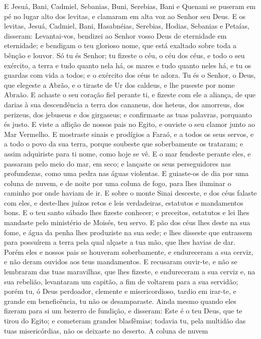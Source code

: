 E Jesuá, Bani, Cadmiel, Sebanias, Buni, Serebias, Bani e Quenani
se puseram em pé no lugar alto dos levitas, e clamaram em alta voz
ao Senhor seu Deus. E os levitas, Jesuá, Cadmiel, Bani,
Hasabnéias, Serebias, Hodias, Sebanias e Petaías, disseram:
Levantai-vos, bendizei ao Senhor vosso Deus de eternidade em
eternidade; e bendigam o teu glorioso nome, que está exaltado sobre
toda a bênção e louvor. Só tu és Senhor; tu fizeste o céu, o céu
dos céus, e todo o seu exército, a terra e tudo quanto nela há, os
mares e tudo quanto neles há, e tu os guardas com vida a todos; e o
exército dos céus te adora. Tu és o Senhor, o Deus, que elegeste
a Abrão, e o tiraste de Ur dos caldeus, e lhe puseste por nome
Abraão. E achaste o seu coração fiel perante ti, e fizeste com
ele a aliança, de que darias à sua descendência a terra dos
cananeus, dos heteus, dos amorreus, dos perizeus, dos jebuseus e dos
girgaseus; e confirmaste as tuas palavras, porquanto és justo. E
viste a aflição de nossos pais no Egito, e ouviste o seu clamor
junto ao Mar Vermelho. E mostraste sinais e prodígios a
Faraó, e a todos os seus servos, e a todo o povo da sua terra,
porque soubeste que soberbamente os trataram; e assim adquiriste
para ti nome, como hoje se vê. E o mar fendeste perante eles,
e passaram pelo meio do mar, em seco; e lançaste os seus
perseguidores nas profundezas, como uma pedra nas águas violentas.
E guiaste-os de dia por uma coluna de nuvem, e de noite por
uma coluna de fogo, para lhes iluminar o caminho por onde haviam de
ir. E sobre o monte Sinai desceste, e dos céus falaste com
eles, e deste-lhes juízos retos e leis verdadeiras, estatutos e
mandamentos bons. E o teu santo sábado lhes fizeste conhecer;
e preceitos, estatutos e lei lhes mandaste pelo ministério de
Moisés, teu servo. E pão dos céus lhes deste na sua fome, e
água da penha lhes produziste na sua sede; e lhes disseste que
entrassem para possuírem a terra pela qual alçaste a tua mão, que
lhes havias de dar. Porém eles e nossos pais se houveram
soberbamente, e endureceram a sua cerviz, e não deram ouvidos aos
teus mandamentos. E recusaram ouvir-te, e não se lembraram
das tuas maravilhas, que lhes fizeste, e endureceram a sua cerviz e,
na sua rebelião, levantaram um capitão, a fim de voltarem para a sua
servidão; porém tu, ó Deus perdoador, clemente e misericordioso,
tardio em irar-te, e grande em beneficência, tu não os desamparaste.
Ainda mesmo quando eles fizeram para si um bezerro de
fundição, e disseram: Este é o teu Deus, que te tirou do Egito; e
cometeram grandes blasfêmias; todavia tu, pela multidão das
tuas misericórdias, não os deixaste no deserto. A coluna de nuvem

